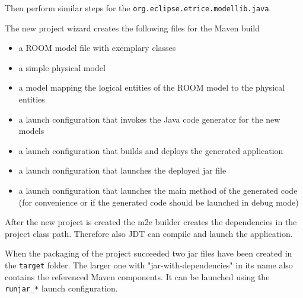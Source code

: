 Then perform similar steps for the \texttt{org.eclipse.etrice.modellib.java}.

The \eTrice{} new project wizard creates the following files for the Maven build
\begin{itemize}
\item a ROOM model file with exemplary classes
\item a simple physical model
\item a model mapping the logical entities of the ROOM model to the physical entities
\item a launch configuration that invokes the \eTrice{} Java code generator for the new models
\item a launch configuration that builds and deploys the generated application
\item a launch configuration that launches the deployed jar file
\item a launch configuration that launches the main method of the generated code (for convenience or
if the generated code should be launched in debug mode)
\end{itemize}

After the new project is created the m2e builder creates the dependencies in the project class path.
Therefore also JDT can compile and launch the application.

When the packaging of the project succeeded two jar files have been created in the \texttt{target} folder.
The larger one with "jar-with-dependencies" in its name also contains the referenced Maven components. It can be
launched using the \texttt{runjar\_*} launch configuration.
